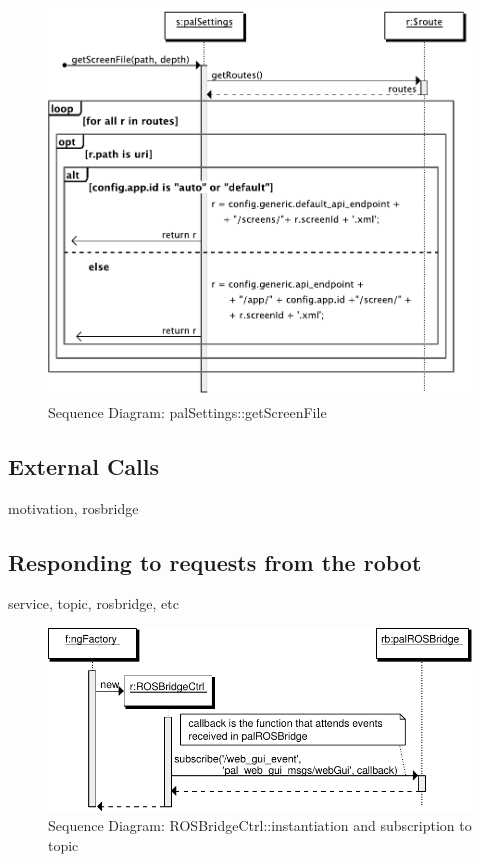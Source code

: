 \begin{figure}[htb]
    \centering
    \includegraphics{figures/design/seqdia/palSettings-getScreenFile.pdf}
    \caption{Sequence Diagram: palSettings::getScreenFile}
    \label{fig:design-seqdia-palsettings-getscreenfile}
\end{figure}

\FloatBarrier

\subsection{External Calls}
motivation, rosbridge

\subsection{Responding to requests from the robot}
service, topic, rosbridge, etc

\begin{figure}[htb]
    \centering
    \includegraphics{figures/design/seqdia/ROSBridgeCtrl-creation.pdf}
    \caption{Sequence Diagram: ROSBridgeCtrl::instantiation and subscription to topic}
    \label{fig:design-seqdia-ROSBridgeCtrl-creation}
\end{figure}

